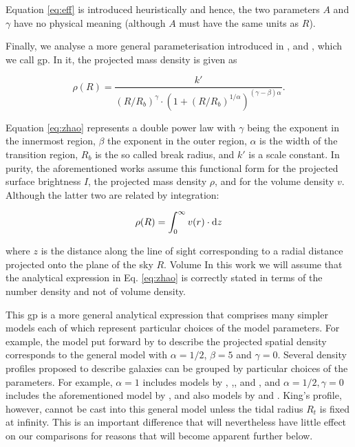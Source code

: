 Equation \ref{eq:eff} is introduced heuristically and hence, the two parameters $A$ and $\gamma$ have no physical meaning (although $A$ must have the same units as $R$).

Finally, we analyse a more general parameterisation introduced in \cite{1995AJ....110.2622L}, \cite{1996AJ....111.1889B} and \cite{Zhao1997}, which we call \gls{gp}. In it, the projected mass density is given as

\begin{equation}
  \rho(R) = \frac{k'}{(R/R_b)^{\gamma}\cdot(1+(R/R_b)^{1/\alpha})^{(\gamma-\beta)\alpha}}.
  \label{eq:zhao}
\end{equation}

Equation \ref{eq:zhao} represents a double power law with $\gamma$ being the exponent in the innermost region, $\beta$ the exponent in the outer region, $\alpha$ is the width of the transition region, $R_b$ is the so called break radius, and $k'$ is a scale constant. In purity, the aforementioned works assume this functional form for the projected surface brightness $I$, the projected mass density $\rho$, and for the volume density $v$. Although the latter two are related by integration:

\begin{equation}
  \rho(R) = \int_{0}^{\infty}v(r)\cdot {\rm d}z  
\end{equation}

where $z$ is the distance along the line of sight corresponding to a radial distance projected onto the plane of the sky $R$.
{Volume}
In this work we will assume that the analytical expression in Eq. \ref{eq:zhao} is correctly stated in terms of the number density and not of volume density.

This \gls{gp} is a more general analytical expression that comprises many simpler models each of which represent particular choices of the model parameters. For example, the model put forward by \cite{1911MNRAS..71..460P} to describe the projected spatial density corresponds to the general model with $\alpha=1/2$, $\beta=5$ and $\gamma=0$. Several density profiles proposed to describe galaxies can be grouped by particular choices of the parameters. For example, $\alpha=1$ includes models by \cite{1997ApJ...490..493N}, \cite{1990ApJ...356..359H},\cite{1983MNRAS.202..995J}, and \cite{1999MNRAS.310.1147M}, and $\alpha=1/2, \gamma=0$ includes the aforementioned model by \cite{1911MNRAS..71..460P}, and also models by \cite{1990ApJ...361..408S} and \cite{1985MNRAS.216..273D}. King's profile, however, cannot be cast into this general model unless the tidal radius $R_t$ is fixed at infinity. This is an important difference that will nevertheless have little effect on our comparisons for reasons that will become apparent further below.

